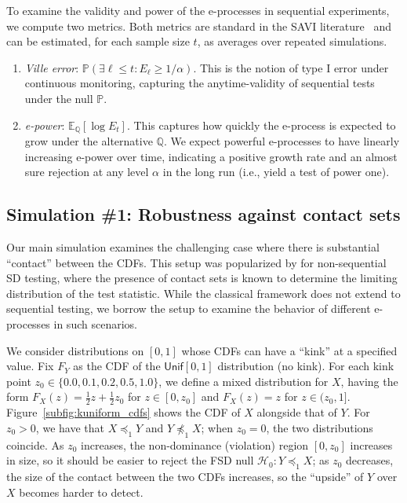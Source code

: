 \documentclass[12pt,twoside]{article}
\theoremstyle{plain}
\theoremstyle{definition}
\theoremstyle{remark}
\newcommand{\inparen}[1]{\left(#1\right)}
\newcommand{\calH}{\mathcal{H}}
\newcommand{\Esymb}{\mathbb{E}}
\newcommand{\Psymb}{\mathbb{P}}
\newcommand{\Qsymb}{\mathbb{Q}}
\newcommand{\Ex}[2]{\Esymb_{{#1}}\left[{#2}\right]}
\newcommand{\fsd}{\preceq_{1}}
\newcommand{\notfsd}{\npreceq_{1}}
\begin{document}
To examine the validity and power of the e-processes in sequential experiments, we compute two metrics. 
Both metrics are standard in the SAVI literature~\citep[e.g.,][]{howard2021time,vovk2024nonparametric} and can be estimated, for each sample size $t$, as averages over repeated simulations. 
\begin{enumerate}
    \item \emph{Ville error}: $\Psymb\inparen{\exists \ell \leq t: E_\ell \geq {1}/{\alpha}}$. 
    This is the notion of type I error under continuous monitoring, capturing the anytime-validity of sequential tests under the null $\Psymb$. 
    \item \emph{e-power}: $\Ex{\Qsymb}{\log E_t}$. 
    This captures how quickly the e-process is expected to grow under the alternative $\Qsymb$.
    We expect powerful e-processes to have linearly increasing e-power over time, indicating a positive growth rate and an almost sure rejection at any level $\alpha$ in the long run (i.e., yield a test of power one).
\end{enumerate}

\subsection{Simulation \#1: Robustness against contact sets}\label{sec:sim_kuniform}

Our main simulation examines the challenging case where there is substantial ``contact'' between the CDFs. 
This setup was popularized by \citet{linton2010improved} for non-sequential SD testing, where the presence of contact sets is known to determine the limiting distribution of the test statistic. 
While the classical framework does not extend to sequential testing, we borrow the setup to examine the behavior of different e-processes in such scenarios.

We consider distributions on $[0,1]$ whose CDFs can have a ``kink'' at a specified value. 
Fix $F_Y$ as the CDF of the $\mathsf{Unif}[0,1]$ distribution (no kink). 
For each kink point $z_0 \in \{0.0, 0.1, 0.2, 0.5, 1.0\}$, we define a mixed distribution for $X$, having the form $F_X(z) = \frac{1}{2} z + \frac{1}{2}z_0$ for $z \in [0, z_0]$ and $F_X(z) = z$ for $z \in (z_0, 1]$.
Figure~\ref{subfig:kuniform_cdfs} shows the CDF of $X$ alongside that of $Y$.
For $z_0 > 0$, we have that $X \fsd Y$ and $Y \notfsd X$; when $z_0=0$, the two distributions coincide. 
As $z_0$ increases, the non-dominance (violation) region $[0, z_0]$ increases in size, so it should be easier to reject the FSD null $\calH_0: Y \fsd X$; as $z_0$ decreases, the size of the contact between the two CDFs increases, so the ``upside'' of $Y$ over $X$ becomes harder to detect. 
\end{document}
